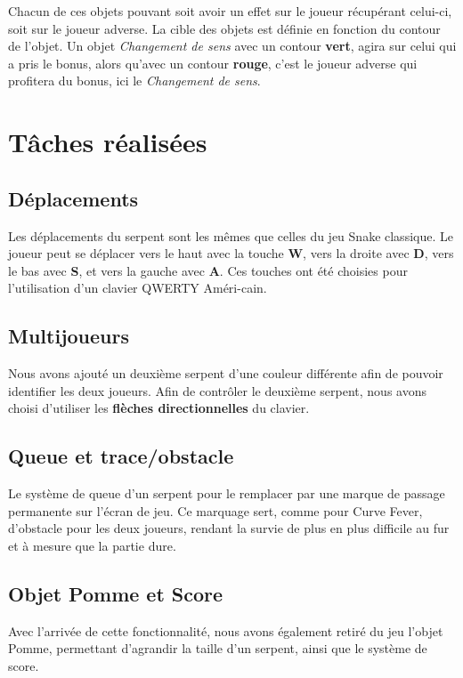\documentclass[12pt, french, a4paper]{article}
\begin{document}
  \vspace{5mm}
  Chacun de ces objets pouvant soit avoir un effet sur le joueur récupérant celui-ci, soit sur le joueur adverse. La cible des objets est définie en fonction du contour de l'objet.
  \newline
  Un objet \textit{Changement de sens} avec un contour \textbf{vert}, agira sur celui qui a pris le bonus, alors qu'avec un contour \textbf{rouge}, c'est le joueur adverse qui profitera du bonus, ici le \textit{Changement de sens}.

  \section{Tâches réalisées}
  \subsection{Déplacements}
  Les déplacements du serpent sont les mêmes que celles du jeu Snake classique. Le joueur peut se déplacer vers le haut avec la touche \textbf{W}, vers la droite avec \textbf{D}, vers le bas avec \textbf{S}, et vers la gauche avec \textbf{A}.
  \newline
  Ces touches ont été choisies pour l'utilisation d'un clavier QWERTY Améri-cain.

  \subsection{Multijoueurs}
  Nous avons ajouté un deuxième serpent d'une couleur différente afin de pouvoir identifier les deux joueurs. Afin de contrôler le deuxième serpent, nous avons choisi d'utiliser les \textbf{flèches directionnelles} du clavier.

  \subsection{Queue et trace/obstacle}
  Le système de queue d'un serpent pour le remplacer par une marque de passage permanente sur l'écran de jeu. Ce marquage sert, comme pour Curve Fever, d'obstacle pour les deux joueurs, rendant la survie de plus en plus difficile au fur et à mesure que la partie dure.

  \subsection{Objet Pomme et Score}
  Avec l'arrivée de cette fonctionnalité, nous avons également retiré du jeu l'objet Pomme, permettant d'agrandir la taille d'un serpent, ainsi que le système de score.
\end{document}
